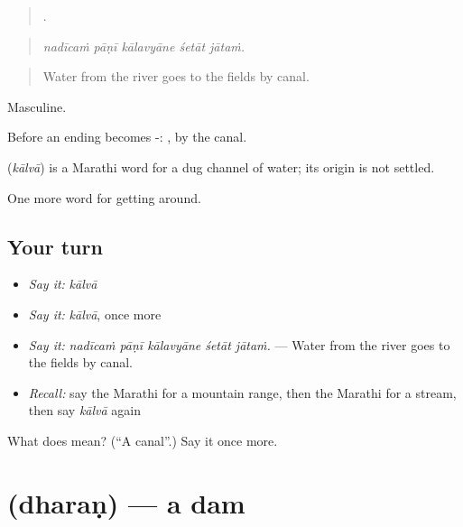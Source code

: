 \begin{quote}
    .
\end{quote}

\begin{quote}
\emph{nadīcaṁ pāṇī kālavyāne śetāt jātaṁ.}
\end{quote}

\begin{quote}
Water from the river goes to the fields by canal.
\end{quote}

Masculine.

Before an ending  becomes -: , by the canal.

\begin{cousinweb}
\textbf{} (\emph{kālvā}) is a Marathi word for a dug channel of water; its origin is not settled.
\end{cousinweb}

\begin{grammarlens}[title={What you've built}]
One more word for getting around.
\end{grammarlens}

\subsection*{Your turn}
\begin{itemize}
\raggedright
  \item \emph{Say it:} \emph{kālvā}
  \item \emph{Say it:} \emph{kālvā}, once more
  \item \emph{Say it:} \emph{nadīcaṁ pāṇī kālavyāne śetāt jātaṁ.} — Water from the river goes to the fields by canal.
  \item \emph{Recall:} say the Marathi for a mountain range, then the Marathi for a stream, then say \emph{kālvā} again
\end{itemize}

\begin{tcolorbox}[breakable,colback=teal!4,colframe=teal!35!black,title={Before you move on}]
What does  mean? (\textquotedblleft{}A canal\textquotedblright{}.) Say it once more.
\end{tcolorbox}
\section[\texorpdfstring{\mr{धरण} (dharaṇ)}{धरण (dharaṇ)}]{ (dharaṇ) — a dam}

